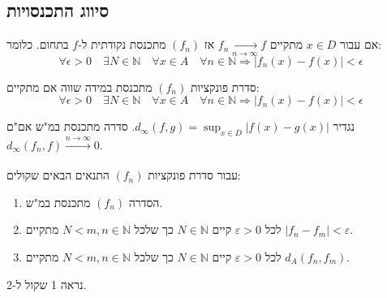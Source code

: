 \documentclass{tstextbook}
\begin{document}
\subsection{סיווג התכנסויות}

\begin{definition}
אם עבור \(x\in D\) מתקיים \(f_n \xrightarrow[n\rightarrow\infty]{} f\) אז \((f_n)\) מתכנסת נקודתית ל-\(f\) בתחום. כלומר:
$$\forall \epsilon > 0 \quad \exists N \in\mathbb{N}\quad \forall x\in A \quad\forall n\in\mathbb{N} \Rightarrow |f_n(x)-f(x)|<\epsilon$$

\end{definition}
\begin{definition}
סדרת פונקציות \((f_{n})\) מתכנסת במידה שווה אם מתקיים:
$$\forall \epsilon > 0 \quad \exists N \in\mathbb{N}\quad \forall x\in A \quad\forall n\in\mathbb{N} \Rightarrow |f_n(x)-f(x)|<\epsilon$$

\end{definition}
\begin{proposition}
נגדיר \(d_\infty(f,g)=\sup_{x\in D}|f(x)-g(x)|\). סדרה מתכנסת במ"ש אם"ם \(d_\infty(f_n,f)\xrightarrow[]{n\rightarrow\infty} 0\).

\end{proposition}
\begin{proposition}
עבור סדרת פונקציות \((f_{n})\) התנאים הבאים שקולים:

  \begin{enumerate}
    \item הסדרה \((f_{n})\) מתכנסת במ"ש. 


    \item לכל \(\varepsilon>0\) קיים \(N\in \mathbb N\) כך שלכל \(N<m,n\in\mathbb N\) מתקיים \(|f_n-f_m|<\varepsilon\). 


    \item לכל \(\varepsilon>0\) קיים \(N\in \mathbb N\) כך שלכל \(N<m,n\in\mathbb N\) מתקיים \(d_A(f_n, f_m)\). 


  \end{enumerate}
\end{proposition}
נראה 1 שקול ל-2.
\end{document}
